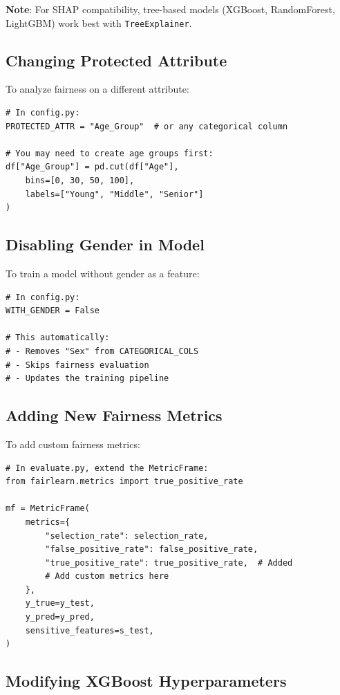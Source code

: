 \documentclass[11pt,a4paper]{article}
\begin{document}
\textbf{Note}: For SHAP compatibility, tree-based models (XGBoost, RandomForest, LightGBM) work best with \texttt{TreeExplainer}.

\subsection{Changing Protected Attribute}

To analyze fairness on a different attribute:

\begin{lstlisting}[style=pythonstyle]
# In config.py:
PROTECTED_ATTR = "Age_Group"  # or any categorical column

# You may need to create age groups first:
df["Age_Group"] = pd.cut(df["Age"],
    bins=[0, 30, 50, 100],
    labels=["Young", "Middle", "Senior"]
)
\end{lstlisting}

\subsection{Disabling Gender in Model}

To train a model without gender as a feature:

\begin{lstlisting}[style=pythonstyle]
# In config.py:
WITH_GENDER = False

# This automatically:
# - Removes "Sex" from CATEGORICAL_COLS
# - Skips fairness evaluation
# - Updates the training pipeline
\end{lstlisting}

\subsection{Adding New Fairness Metrics}

To add custom fairness metrics:

\begin{lstlisting}[style=pythonstyle]
# In evaluate.py, extend the MetricFrame:
from fairlearn.metrics import true_positive_rate

mf = MetricFrame(
    metrics={
        "selection_rate": selection_rate,
        "false_positive_rate": false_positive_rate,
        "true_positive_rate": true_positive_rate,  # Added
        # Add custom metrics here
    },
    y_true=y_test,
    y_pred=y_pred,
    sensitive_features=s_test,
)
\end{lstlisting}

\subsection{Modifying XGBoost Hyperparameters}
\end{document}
